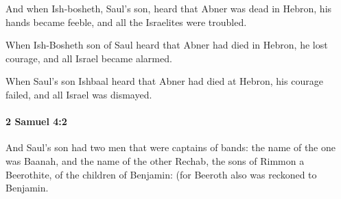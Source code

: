 			\begin{versebox}
					\item[BHS] 
					\item[ASV] And when Ish-bosheth, Saul's son, heard that Abner was dead in Hebron, his hands became feeble, and all the Israelites were troubled.
					\item[NIV] When Ish-Bosheth son of Saul heard that Abner had died in Hebron, he lost courage, and all Israel became alarmed.
					\item[NRSV] When Saul’s son Ishbaal heard that Abner had died at Hebron, his courage failed, and all Israel was dismayed.
			\end{versebox}

		\paragraph{2 Samuel 4:2} %
			\label{2SAMUEL-4-2}

			And Saul’s son had two men that were captains of bands: the name of the one was Baanah, and the name of the other Rechab, the sons of Rimmon a Beerothite, of the children of Benjamin: (for Beeroth also was reckoned to Benjamin.

